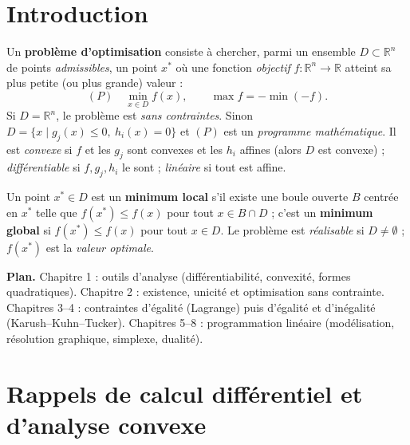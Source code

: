 \documentclass[a4paper,11pt]{report}
\theoremstyle{plain}
\theoremstyle{definition}
\theoremstyle{remark}
\newcommand{\R}{\mathbb{R}}
\begin{document}
			
			\tableofcontents
			
			\chapter*{Introduction}
			Un \textbf{problème d'optimisation} consiste à chercher, parmi un ensemble $D\subset\R^n$ de points \emph{admissibles}, un point $x^*$ où une fonction \emph{objectif} $f:\R^n\to\R$ atteint sa plus petite (ou plus grande) valeur :
			\[
			(P)\quad \min_{x\in D} f(x),\qquad \max f=-\min(-f).
			\]
			Si $D=\R^n$, le problème est \emph{sans contraintes}. Sinon $D=\{x\mid g_j(x)\le0,\ h_i(x)=0\}$ et $(P)$ est un \emph{programme mathématique}. Il est \emph{convexe} si $f$ et les $g_j$ sont convexes et les $h_i$ affines (alors $D$ est convexe) ; \emph{différentiable} si $f,g_j,h_i$ le sont ; \emph{linéaire} si tout est affine.
			
			Un point $x^*\in D$ est un \textbf{minimum local} s'il existe une boule ouverte $B$ centrée en $x^*$ telle que $f(x^*)\le f(x)$ pour tout $x\in B\cap D$ ; c'est un \textbf{minimum global} si $f(x^*)\le f(x)$ pour tout $x\in D$. Le problème est \emph{réalisable} si $D\ne\emptyset$ ; $f(x^*)$ est la \emph{valeur optimale}.
			
			\textbf{Plan.} Chapitre 1 : outils d'analyse (différentiabilité, convexité, formes quadratiques). Chapitre 2 : existence, unicité et optimisation sans contrainte. Chapitres 3--4 : contraintes d'égalité (Lagrange) puis d'égalité et d'inégalité (Karush--Kuhn--Tucker). Chapitres 5--8 : programmation linéaire (modélisation, résolution graphique, simplexe, dualité).
			
			\chapter{Rappels de calcul différentiel et d'analyse convexe}
			
\end{document}
